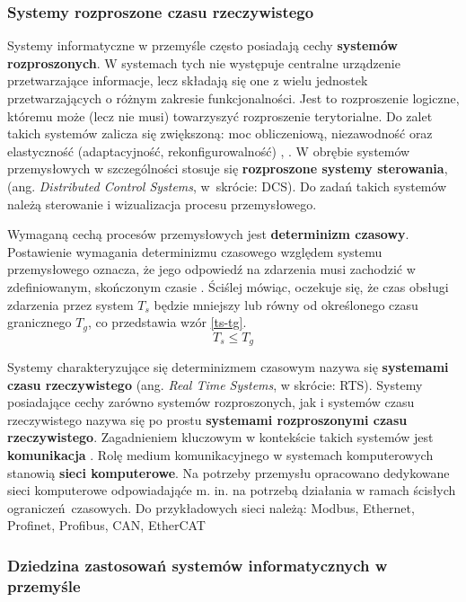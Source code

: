 \documentclass[a4paper, 12pt, twoside]{article}
\begin{document}
\subsubsection{Systemy rozproszone czasu rzeczywistego}

Systemy informatyczne w przemyśle często posiadają cechy \textbf{systemów rozproszonych}.
W systemach tych nie występuje centralne urządzenie
przetwarzające informacje, lecz składają się one z wielu jednostek
przetwarzających o różnym zakresie funkcjonalności. Jest to rozproszenie logiczne,
któremu może (lecz nie musi) towarzyszyć rozproszenie terytorialne. Do zalet
takich systemów zalicza się zwiększoną: moc obliczeniową, niezawodność oraz 
elastyczność (adaptacyjność, rekonfigurowalność)
\cite{isp},
\cite{isp-analiza-przepływu-informacji}. W obrębie systemów przemysłowych
w szczególności stosuje się \textbf{rozproszone systemy sterowania}, 
(ang. \emph{Distributed Control Systems}, w~skrócie: DCS). Do zadań takich systemów
należą sterowanie i wizualizacja procesu przemysłowego. 

Wymaganą cechą procesów przemysłowych jest \textbf{determinizm czasowy}.
Postawienie wymagania determinizmu czasowego względem systemu przemysłowego oznacza,
że jego odpowiedź na zdarzenia musi zachodzić w zdefiniowanym, skończonym czasie
\cite{isp}.
Ściślej mówiąc, oczekuje się, że czas obsługi zdarzenia przez system $T_s$ będzie
mniejszy lub równy od określonego czasu granicznego $T_g$, co przedstawia 
wzór \ref{ts-tg}.
\begin{equation}
    T_s \leq T_g\label{ts-tg}
\end{equation}

Systemy charakteryzujące się determinizmem czasowym nazywa się 
\textbf{systemami czasu rzeczywistego} (ang. \emph{Real Time Systems}, w skrócie: RTS). 
Systemy posiadające cechy zarówno systemów rozproszonych, jak i systemów
czasu rzeczywistego nazywa się po prostu \textbf{systemami rozproszonymi czasu rzeczywistego}.
Zagadnieniem kluczowym w kontekście takich systemów
jest \textbf{komunikacja} \cite{isp-analiza-przepływu-informacji}.
Rolę medium komunikacyjnego
w systemach komputerowych stanowią \textbf{sieci komputerowe}. Na potrzeby 
przemysłu opracowano dedykowane sieci komputerowe odpowiadająće m. in. na potrzebą
działania w ramach ścisłych ograniczeń czasowych. Do przykładowych sieci należą:
Modbus, Ethernet, Profinet, Profibus, CAN, EtherCAT


\subsubsection{Dziedzina zastosowań systemów informatycznych w przemyśle}
\end{document}
